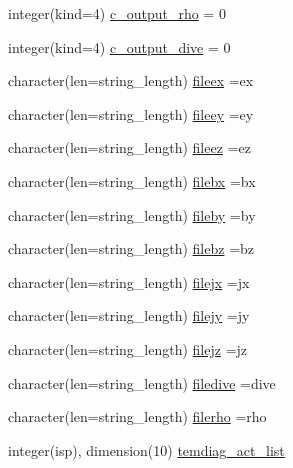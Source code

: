 \begin{DoxyCompactItemize}
\item 
integer(kind=4) \hyperlink{namespaceoutput__data_afab9a486a2aff0dc3d89dbbcc7bb3007}{c\+\_\+output\+\_\+rho} = 0
\item 
integer(kind=4) \hyperlink{namespaceoutput__data_aa7538787d744441b4f595752dabc3897}{c\+\_\+output\+\_\+dive} = 0
\item 
character(len=string\+\_\+length) \hyperlink{namespaceoutput__data_aa8d95fb60904ef94d39d3c06ebc6d4d7}{fileex} =\textquotesingle{}ex\textquotesingle{}
\item 
character(len=string\+\_\+length) \hyperlink{namespaceoutput__data_a368d30c58c5484d6e8caf5e536d2da0c}{fileey} =\textquotesingle{}ey\textquotesingle{}
\item 
character(len=string\+\_\+length) \hyperlink{namespaceoutput__data_ab01ba0f2c67ee55da96a855e8da8382c}{fileez} =\textquotesingle{}ez\textquotesingle{}
\item 
character(len=string\+\_\+length) \hyperlink{namespaceoutput__data_ac0a6ec606c33d1bc037b5ce85a9f4b3a}{filebx} =\textquotesingle{}bx\textquotesingle{}
\item 
character(len=string\+\_\+length) \hyperlink{namespaceoutput__data_ac6e874f0a8121e42bed35e449a4a7c38}{fileby} =\textquotesingle{}by\textquotesingle{}
\item 
character(len=string\+\_\+length) \hyperlink{namespaceoutput__data_a07a77b208c10f32c5723378f16ea4301}{filebz} =\textquotesingle{}bz\textquotesingle{}
\item 
character(len=string\+\_\+length) \hyperlink{namespaceoutput__data_a1e0f229429f07c107635c7844afa8d39}{filejx} =\textquotesingle{}jx\textquotesingle{}
\item 
character(len=string\+\_\+length) \hyperlink{namespaceoutput__data_afaf1fb3c71c81a246f6af6ca881610ec}{filejy} =\textquotesingle{}jy\textquotesingle{}
\item 
character(len=string\+\_\+length) \hyperlink{namespaceoutput__data_a3656388605a302a6fc4c579fe82eb10b}{filejz} =\textquotesingle{}jz\textquotesingle{}
\item 
character(len=string\+\_\+length) \hyperlink{namespaceoutput__data_a655183a11c6badb83f94a4f05b94f95e}{filedive} =\textquotesingle{}dive\textquotesingle{}
\item 
character(len=string\+\_\+length) \hyperlink{namespaceoutput__data_abd9468ccde074971628171196a7873f2}{filerho} =\textquotesingle{}rho\textquotesingle{}
\item 
integer(isp), dimension(10) \hyperlink{namespaceoutput__data_a63d2f446c4aca8bf956973b6ff9bcfb0}{temdiag\+\_\+act\+\_\+list}

\end{DoxyCompactItemize}
